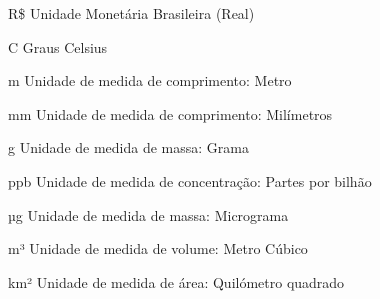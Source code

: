 \documentclass[
  12pt,		%
  a4paper,	%
  openright,%
  oneside,	%
  chapter=TITLE,		%
  section=TITLE,		%
  english,	%
  french,	%
  spanish,	%
  brazil	%
]{abntex2}
\begin{document}
    
    \begin{simbolos}
        \item[R\$] Unidade Monetária Brasileira (Real)
        \item[\degree C] Graus Celsius
        \item[m] Unidade de medida de comprimento: Metro
        \item[mm] Unidade de medida de comprimento: Milímetros
        \item[g] Unidade de medida de massa: Grama
        \item[ppb] Unidade de medida de concentração: Partes por bilhão
        \item[µg] Unidade de medida de massa: Micrograma
        \item[m³] Unidade de medida de volume: Metro Cúbico
        \item[km²] Unidade de medida de área: Quilómetro quadrado
    \end{simbolos}
    
    
    \tableofcontents*
    \newpage
    
    
\end{document}
